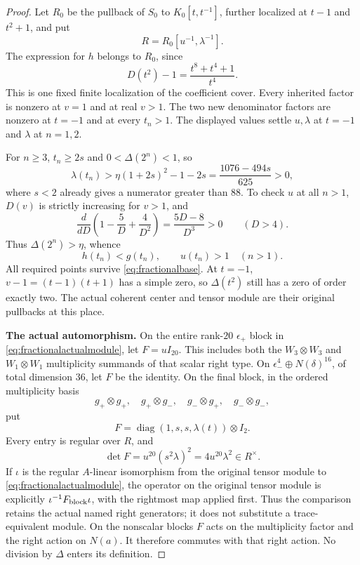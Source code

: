 \documentclass[11pt,a4paper]{article}
\theoremstyle{named}\newtheorem{finding}{Finding}[section]
\theoremstyle{definition}\newtheorem{definition}[finding]{Definition}
\theoremstyle{remark}\newtheorem{remark}[finding]{Remark}
\begin{document}
\begin{proof}
Let $R_0$ be the pullback of $S_0$ to $K_0[t,t^{-1}]$,
further localized at $t-1$ and $t^2+1$, and put
\begin{equation}\label{eq:fractionalbase}
 R=R_0[u^{-1},\lambda^{-1}].
\end{equation}
The expression for $h$ belongs to $R_0$, since
\[
 D(t^2)-1=\frac{t^8+t^4+1}{t^4}.
\]
This is one fixed finite localization of the coefficient
cover. Every inherited factor is nonzero at $v=1$
and at real $v>1$. The two new denominator factors
are nonzero at $t=-1$ and at every $t_n>1$.
The displayed values settle $u,\lambda$ at $t=-1$
and $\lambda$ at $n=1,2$.

For $n\ge3$, $t_n\ge2s$ and $0<\Delta(2^n)<1$, so
\[
 \lambda(t_n)>
 \eta(1+2s)^2-1-2s
 =\frac{1076-494s}{625}>0,
\]
where $s<2$ already gives a numerator greater than $88$.
To check $u$ at all $n>1$, $D(v)$ is strictly increasing
for $v>1$, and
\[
 \frac{d}{dD}\left(1-\frac5D+\frac4{D^2}\right)
      =\frac{5D-8}{D^3}>0\qquad(D>4).
\]
Thus $\Delta(2^n)>\eta$, whence
\begin{equation}\label{eq:fractionalmonotonicity}
 h(t_n)<g(t_n),\qquad u(t_n)>1\quad(n>1).
\end{equation}
All required points survive \eqref{eq:fractionalbase}.
At $t=-1$, $v-1=(t-1)(t+1)$ has a simple zero,
so $\Delta(t^2)$ still has a zero of order exactly two.
The actual coherent center and tensor module are
their original pullbacks at this place.

\par\smallskip\noindent\textbf{The actual automorphism.}\quad
On the entire rank-$20$ $\epsilon_+$ block in
\eqref{eq:fractionalactualmodule}, let $F=uI_{20}$.
This includes both the $W_3\otimes W_3$ and
$W_1\otimes W_1$ multiplicity summands of that scalar
right type.
On $\epsilon_-^4\oplus N(\delta)^{16}$, of total
dimension $36$, let $F$ be the identity.
On the final block, in the ordered multiplicity basis
\[
 g_+\otimes g_+,\quad g_+\otimes g_-,\quad
 g_-\otimes g_+,\quad g_-\otimes g_-,
\]
put
\begin{equation}\label{eq:fractionaloperator}
 F=\operatorname{diag}(1,s,s,\lambda(t))\otimes I_2.
\end{equation}
Every entry is regular over $R$, and
\[
 \det F=u^{20}(s^2\lambda)^2=4u^{20}\lambda^2
          \in R^\times.
\]
If $\iota$ is the regular $A$-linear isomorphism
from the original tensor module to
\eqref{eq:fractionalactualmodule}, the operator on the
original tensor module is explicitly
$\iota^{-1}F_{\rm block}\iota$, with the rightmost map
applied first.
Thus the comparison retains the actual named right
generators; it does not substitute a trace-equivalent
module. On the nonscalar blocks $F$ acts on the
multiplicity factor and the right action on $N(a)$.
It therefore commutes with that right action.
No division by $\Delta$ enters its definition.


\end{proof}
\end{document}
